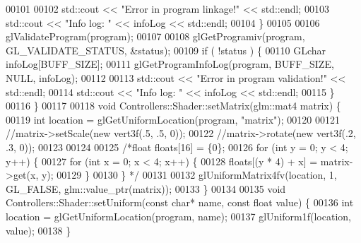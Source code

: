 \begin{DoxyCode}
00101 
00102         std::cout << \textcolor{stringliteral}{"Error in program linkage!"} << std::endl;
00103         std::cout << \textcolor{stringliteral}{"Info log: "} << infoLog << std::endl;
00104     \}
00105 
00106     glValidateProgram(program);
00107 
00108     glGetProgramiv(program, GL\_VALIDATE\_STATUS, &status);
00109     \textcolor{keywordflow}{if} ( !status ) \{
00110         GLchar infoLog[BUFF\_SIZE];
00111         glGetProgramInfoLog(program, BUFF\_SIZE, NULL, infoLog);
00112 
00113         std::cout << \textcolor{stringliteral}{"Error in program validation!"} << std::endl;
00114         std::cout << \textcolor{stringliteral}{"Info log: "} << infoLog << std::endl;
00115     \}
00116 \}
00117 
00118 \textcolor{keywordtype}{void} Controllers::Shader::setMatrix(glm::mat4 matrix) \{
00119     \textcolor{keywordtype}{int} location = glGetUniformLocation(program, \textcolor{stringliteral}{"matrix"});
00120 
00121     \textcolor{comment}{//matrix->setScale(new vert3f(.5, .5, 0));}
00122     \textcolor{comment}{//matrix->rotate(new vert3f(.2, .3, 0));}
00123 
00124 
00125     \textcolor{comment}{/*float floats[16] = \{0\};}
00126 \textcolor{comment}{    for (int y = 0; y < 4; y++) \{}
00127 \textcolor{comment}{        for (int x = 0; x < 4; x++) \{}
00128 \textcolor{comment}{            floats[(y * 4) + x] = matrix->get(x, y);}
00129 \textcolor{comment}{        \}}
00130 \textcolor{comment}{    \} */}
00131 
00132     glUniformMatrix4fv(location, 1, GL\_FALSE, glm::value\_ptr(matrix));
00133 \}
00134 
00135 \textcolor{keywordtype}{void} Controllers::Shader::setUniform(\textcolor{keyword}{const} \textcolor{keywordtype}{char}* name, \textcolor{keyword}{const} \textcolor{keywordtype}{float} value) \{
00136     \textcolor{keywordtype}{int} location = glGetUniformLocation(program, name);
00137     glUniform1f(location, value);
00138 \}
\end{DoxyCode}
